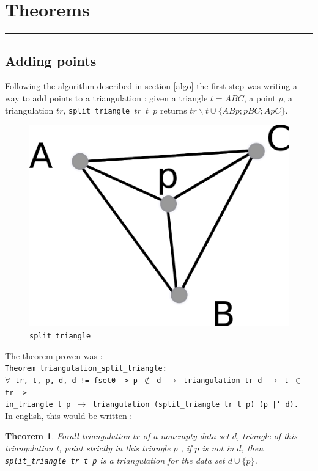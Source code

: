 \documentclass[a4paper,10pt]{article}
\newtheorem{theorem}{Theorem}
\begin{document}
\section{Theorems}
\rule{\linewidth}{0.5pt}
\subsection{Adding points}
\label{theorem1}
Following the algorithm described in section \ref{algo} the first step was writing a way to add points to a triangulation : given a triangle $t = ABC$, a point $p$, a triangulation $tr$, {\tt split\_triangle $tr$ $t$ $p$} returns $tr \smallsetminus t \cup \{ABp;pBC;ApC\}$.
\begin{figure}[h]
  \centering
  \caption{\label{split_triangle} {\tt split\_triangle}}
  \includegraphics[scale=2]{split_triangle}
\end{figure}

 The theorem proven was :\\
{\tt Theorem triangulation\_split\_triangle:\\
  $\forall$ tr, t, p, d, d != fset0 -> p $\notin$ d $\rightarrow$
                        triangulation tr d $\rightarrow$ t $\in$ tr ->\\
                        in\_triangle t p $\rightarrow$
                        triangulation (split\_triangle tr t p) (p |` d).\\
                       }
In english, this would be written :
\begin{theorem}
  Forall triangulation $tr$ of a nonempty data set $d$,
  triangle of this triangulation t, point strictly in this triangle $p$ ,
  if $p$ is not in $d$, then
  {\tt split\_triangle tr t p} is a triangulation for the data set $d \cup \{p\}$.
\end{theorem}
\end{document}
